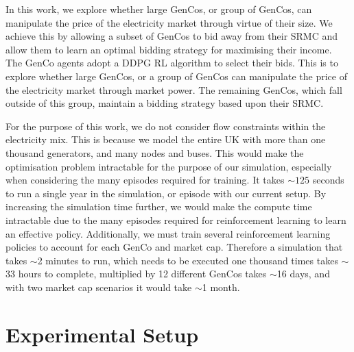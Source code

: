 In this work, we explore whether large GenCos, or group of GenCos, can manipulate the price of the electricity market through virtue of their size. We achieve this by allowing a subset of GenCos to bid away from their SRMC and allow them to learn an optimal bidding strategy for maximising their income. The GenCo agents adopt a DDPG RL algorithm to select their bids. This is to explore whether large GenCos, or a group of GenCos can manipulate the price of the electricity market through market power. The remaining GenCos, which fall outside of this group, maintain a bidding strategy based upon their SRMC.

For the purpose of this work, we do not consider flow constraints within the electricity mix. This is because we model the entire UK with more than one thousand generators, and many nodes and buses. This would make the optimisation problem intractable for the purpose of our simulation, especially when considering the many episodes required for training. It takes ${\sim}125$ seconds to run a single year in the simulation, or episode with our current setup. By increasing the simulation time further, we would make the compute time intractable due to the many episodes required for reinforcement learning to learn an effective policy. Additionally, we must train several reinforcement learning policies to account for each GenCo and market cap. Therefore a simulation that takes ${\sim}$2 minutes to run, which needs to be executed one thousand times takes ${\sim}$33 hours to complete, multiplied by 12 different GenCos takes ${\sim}$16 days, and with two market cap scenarios it would take ${\sim}$1 month.









\section{Experimental Setup}
\label{rl:sec:methodology}


